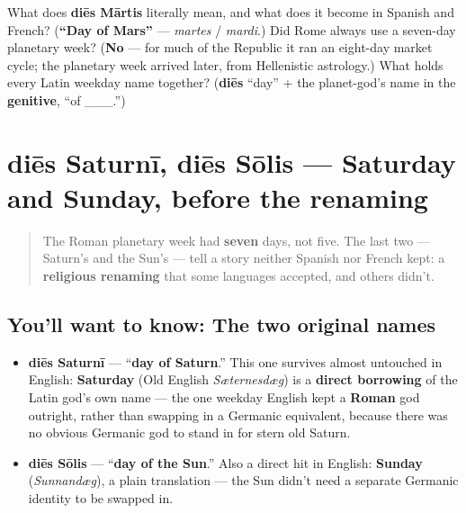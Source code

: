 \begin{tcolorbox}[breakable,colback=teal!4,colframe=teal!35!black,title={Before you move on}]
What does \textbf{diēs Mārtis} literally mean, and what does it become in Spanish and French? (\textbf{\textquotedblleft{}Day of Mars\textquotedblright{}} — \emph{martes} / \emph{mardi}.) Did Rome always use a seven-day planetary week? (\textbf{No} — for much of the Republic it ran an eight-day market cycle; the planetary week arrived later, from Hellenistic astrology.) What holds every Latin weekday name together? (\textbf{diēs} \textquotedblleft{}day\textquotedblright{} + the planet-god's name in the \textbf{genitive}, \textquotedblleft{}of \_\_\_.\textquotedblright{})
\end{tcolorbox}
\section[diēs Saturnī, diēs Sōlis]{diēs Saturnī, diēs Sōlis — Saturday and Sunday, before the renaming}

\label{lesson:LA-C05-saturni-solis}



\begin{quote}
The Roman planetary week had \textbf{seven} days, not five. The last two — Saturn's and the Sun's — tell a story neither Spanish nor French kept: a \textbf{religious renaming} that some languages accepted, and others didn't.
\end{quote}

\subsection*{You'll want to know: The two original names}
\begin{itemize}
\raggedright
  \item \textbf{diēs Saturnī} — \textquotedblleft{}\textbf{day of Saturn}.\textquotedblright{} This one survives almost untouched in English: \textbf{Saturday} (Old English \emph{Sæternesdæg}) is a \textbf{direct borrowing} of the Latin god's own name — the one weekday English kept a \textbf{Roman} god outright, rather than swapping in a Germanic equivalent, because there was no obvious Germanic god to stand in for stern old Saturn.
  \item \textbf{diēs Sōlis} — \textquotedblleft{}\textbf{day of the Sun}.\textquotedblright{} Also a direct hit in English: \textbf{Sunday} (\emph{Sunnandæg}), a plain translation — the Sun didn't need a separate Germanic identity to be swapped in.
\end{itemize}

